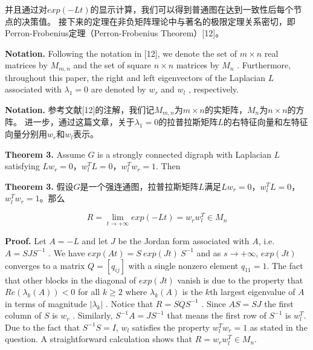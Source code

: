 \documentclass{article}
\begin{document}
\noindent 并且通过对$exp(-Lt)$的显示计算，我们可以得到普通图在达到一致性后每个节点的决策值。
接下来的定理在非负矩阵理论中与著名的极限定理关系密切，即Perron-Frobenius定理（Perron-Frobenius Theorem）[12]。

{\color[gray]{0.5}
\noindent \textbf{Notation.} Following the notation in [12], we denote the set of $m\times n$ real matrices by $M_{m,n}$  and the set of square $n\times n$ matrices by $M_n$ . 
Furthermore, throughout this paper, the right and left eigenvectors of the Laplacian $L$ associated with $\lambda_1 = 0$ are denoted by $w_r$ and $w_l$ , respectively.
}

\noindent \textbf{Notation.} 参考文献[12]的注解，我们记$M_{m,n}$为$m\times n$的实矩阵，$M_n$为$n \times n$的方阵。
进一步，通过这篇文章，关于$\lambda_1 = 0$的拉普拉斯矩阵$L$的右特征向量和左特征向量分别用$w_r$和$w_l$表示。

{\color[gray]{0.5}
\noindent \textbf{Theorem 3.} Assume $G$ is a strongly connected digraph with Laplacian $L$ satisfying $Lw_r=0$，$w_l^TL = 0$，$w_l^Tw_r=1$. Then
}

\noindent \textbf{Theorem 3.} 假设$G$是一个强连通图，拉普拉斯矩阵$L$满足$Lw_r=0$，$w_l^TL = 0$，$w_l^Tw_r=1$。那么

\begin{equation}
    R = \lim_{t\rightarrow +\infty} exp(-Lt) = w_r w_l^T \in M_n
    \tag{18}
    \label{18}
\end{equation}


{\color[gray]{0.5}
\noindent \textbf{Proof.} Let $A=-L$ and let $J$ be the Jordan form associated with $A$, i.e. $A=SJS^{-1}$ . 
We have $exp(At) = S\ exp(Jt)\ S^{-1}$ and as $s\rightarrow +\infty$, $exp(Jt)$ converges to a matrix $Q=[q_{ij}]$ with a single nonzero element $q_{11}=1$. 
The fact that other blocks in the diagonal of $exp(Jt)$ vanish is due to the property that $Re(\lambda_k(A))<0$ for all $k\ge2$ where $\lambda_k(A)$ is the $k$th largest eigenvalue of $A$ in terms of magnitude $|\lambda_k|$ . 
Notice that $R=SQS^{-1}$ . 
Since $AS=SJ$ the ﬁrst column of $S$ is $w_r$ . 
Similarly, $S^{-1}A = JS^{-1}$ that means the ﬁrst row of $S^{-1}$ is $w_l^T$. 
Due to the fact that $S^{-1}S=I$, $w_l$ satisﬁes the property $w_l^Tw_r=1$ as stated in the question. 
A straightforward calculation shows that $R=w_rw_l^T\in M_n$.
}
\end{document}
